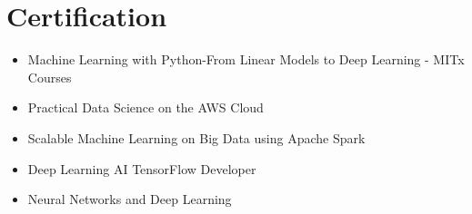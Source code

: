 \documentclass[letterpaper,11pt]{article}
\begin{document}
\section{Certification}
    \begin{multicols}{2}
            \begin{itemize}[itemsep=-5pt, parsep=8pt]
                \item Machine Learning with Python-From Linear Models to Deep Learning - MITx Courses
                \item Practical Data Science on the AWS Cloud
                \item Scalable Machine Learning on Big Data using Apache Spark
                \item Deep Learning AI TensorFlow Developer
                \item Neural Networks and Deep Learning  
            \end{itemize}
        \end{multicols}
        \vspace*{2.0\multicolsep}
\end{document}
